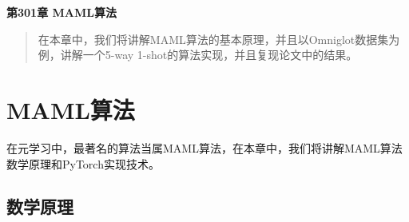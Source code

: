 \newpage
\maketitle
\begin{center}
\Large \textbf{第301章 MAML算法} \quad 
\end{center}
\begin{abstract}
在本章中，我们将讲解MAML算法的基本原理，并且以Omniglot数据集为例，讲解一个5-way 1-shot的算法实现，并且复现论文中的结果。
\end{abstract}
\section{MAML算法}
在元学习中，最著名的算法当属MAML算法，在本章中，我们将讲解MAML算法数学原理和PyTorch实现技术。
\subsection{数学原理}

